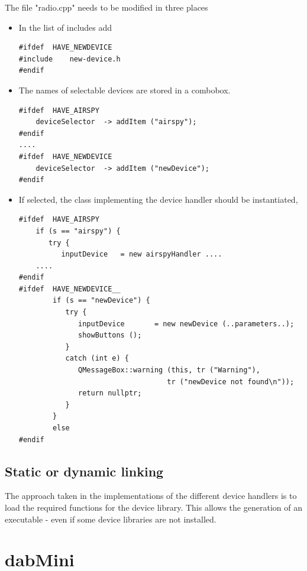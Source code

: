 \documentclass[12pt]{article}
\begin{document}
The file "radio.cpp" needs to be modified in three places
\begin{itemize}
\item  In the list of includes add
{\small
\begin{verbatim}
#ifdef	HAVE_NEWDEVICE
#include	new-device.h
#endif
\end{verbatim}
}
\item The names of selectable devices are stored in a combobox.
{\small
\begin{verbatim}
#ifdef	HAVE_AIRSPY
	deviceSelector	-> addItem ("airspy");
#endif
....
#ifdef	HAVE_NEWDEVICE
	deviceSelector	-> addItem ("newDevice");
#endif
\end{verbatim}
}
\item If selected, the class implementing the device handler should
be instantiated,
{\small
\begin{verbatim}
#ifdef	HAVE_AIRSPY
	if (s == "airspy") {
	   try {
	      inputDevice	= new airspyHandler ....
	....
#endif
#ifdef  HAVE_NEWDEVICE__
        if (s == "newDevice") {
           try {
              inputDevice       = new newDevice (..parameters..);
              showButtons ();
           }
           catch (int e) {
              QMessageBox::warning (this, tr ("Warning"),
                                   tr ("newDevice not found\n"));
              return nullptr;
           }
        }
        else
#endif
\end{verbatim}
}
\end{itemize}
\subsection{Static or dynamic linking}
The approach taken in the implementations of the different device handlers
is to load the required functions for the device library. This allows the
generation of an executable - even if some device libraries are not installed.
\section{dabMini}
\end{document}
